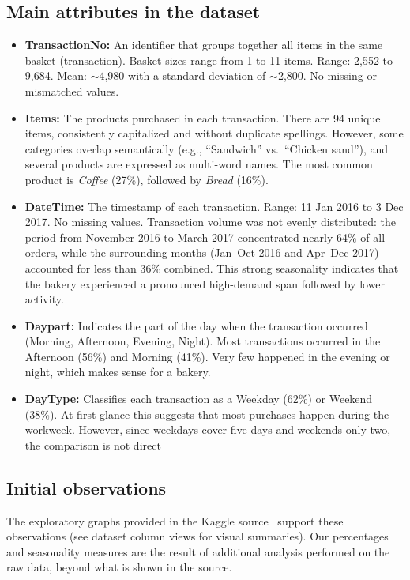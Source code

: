 \subsection*{Main attributes in the dataset}
\begin{itemize}
    \item \textbf{TransactionNo:} An identifier that groups together all items in the same basket (transaction).  
    Basket sizes range from 1 to 11 items.  
    Range: 2,552 to 9,684.  
    Mean: $\sim$4,980 with a standard deviation of $\sim$2,800.  
    No missing or mismatched values.  

    \item \textbf{Items:} The products purchased in each transaction.  
There are 94 unique items, consistently capitalized and without duplicate spellings.  
However, some categories overlap semantically (e.g., ``Sandwich'' vs.\ ``Chicken sand''), 
and several products are expressed as multi-word names.  
The most common product is \textit{Coffee} (27\%), followed by \textit{Bread} (16\%).  

    \item \textbf{DateTime:} The timestamp of each transaction.  
    Range: 11 Jan 2016 to 3 Dec 2017.  
    No missing values.  
    Transaction volume was not evenly distributed: the period from 
    November 2016 to March 2017 concentrated nearly 64\% of all orders, 
    while the surrounding months (Jan--Oct 2016 and Apr--Dec 2017) 
    accounted for less than 36\% combined.  
    This strong seasonality indicates that the bakery experienced 
    a pronounced high-demand span followed by lower activity.  

    \item \textbf{Daypart:} Indicates the part of the day when the transaction occurred (Morning, Afternoon, Evening, Night).  
    Most transactions occurred in the Afternoon (56\%) and Morning (41\%).  
    Very few happened in the evening or night, which makes sense for a bakery.  

    \item \textbf{DayType:} Classifies each transaction as a Weekday (62\%) or Weekend (38\%).  
    At first glance this suggests that most purchases happen during the workweek. 
    However, since weekdays cover five days and weekends only two, the comparison is not direct

\end{itemize}

\subsection*{Initial observations}
The exploratory graphs provided in the Kaggle source~\cite{bakerydata} 
support these observations (see dataset column views for visual summaries).  
Our percentages and seasonality measures are the result of additional analysis 
performed on the raw data, beyond what is shown in the source.  


